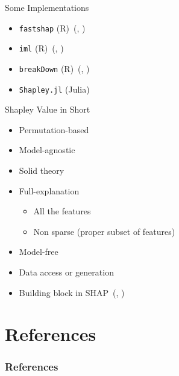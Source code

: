 \documentclass[dvipsnames]{beamer}
\renewcommand{\cite}[1]{(\citeauthor{#1}, \citeyear{#1})}
\begin{document}


\begin{frame}[fragile]{Some Implementations}
	\begin{itemize}
		\item \verb|fastshap| (R)~\cite{jethani2021fastshap}
		\item \verb|iml| (R)~\cite{molnar2018iml}
		\item \verb|breakDown| (R)~\cite{staniak2018explanations}
		\item \verb|Shapley.jl| (Julia)~\footnotemark
	\end{itemize}
\end{frame}

\begin{frame}{Shapley Value in Short}
	\begin{itemize}
		\item Permutation-based
		\item Model-agnostic
		\item Solid theory
		\item Full-explanation
		\begin{itemize}
			\item All the features
			\item Non sparse (proper subset of features)
		\end{itemize}
		\item Model-free
		\item Data access or generation
		\item Building block in SHAP~\cite{lundberg2017unified}
	\end{itemize}
\end{frame}

\section{References}
\begin{frame}[allowframebreaks]
\frametitle{References}
\printbibliography
\end{frame}
\end{document}
